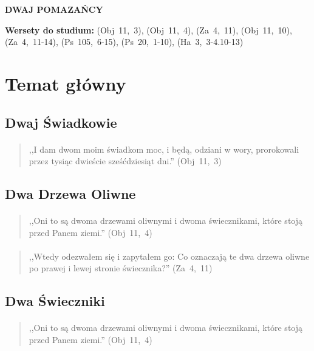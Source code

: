 \documentclass[10pt,a4paper,oneside]{article}
\begin{document}
\centerline{\textbf{\MakeUppercase{Dwaj Pomazańcy}}}
\begin{center}
\textbf{Wersety do studium:} \mbox{(Obj 11, 3)}, \mbox{(Obj 11, 4)}, \mbox{(Za 4, 11)}, \mbox{(Obj 11, 10)}, \mbox{(Za 4, 11-14)}, \mbox{(Ps 105, 6-15)}, \mbox{(Ps 20, 1-10)}, \mbox{(Ha 3, 3-4.10-13)}
\end{center}
\section{Temat główny}
\subsection{Dwaj Świadkowie}
\paragraph{}
\begin{quote}
,,I dam dwom moim świadkom moc, i będą, odziani w wory, prorokowali przez tysiąc dwieście sześćdziesiąt dni.'' \mbox{(Obj 11, 3)}
\end{quote}
\subsection{Dwa Drzewa Oliwne}
\paragraph{}
\begin{quote}
,,Oni to są dwoma drzewami oliwnymi i dwoma świecznikami, które stoją przed Panem ziemi.'' \mbox{(Obj 11, 4)}
\end{quote}
\paragraph{}
\begin{quote}
,,Wtedy odezwałem się i zapytałem go: Co oznaczają te dwa drzewa oliwne po prawej i lewej stronie świecznika?'' \mbox{(Za 4, 11)}
\end{quote}
\subsection{Dwa Świeczniki}
\paragraph{}
\begin{quote}
,,Oni to są dwoma drzewami oliwnymi i dwoma świecznikami, które stoją przed Panem ziemi.'' \mbox{(Obj 11, 4)}
\end{quote}
\end{document}
